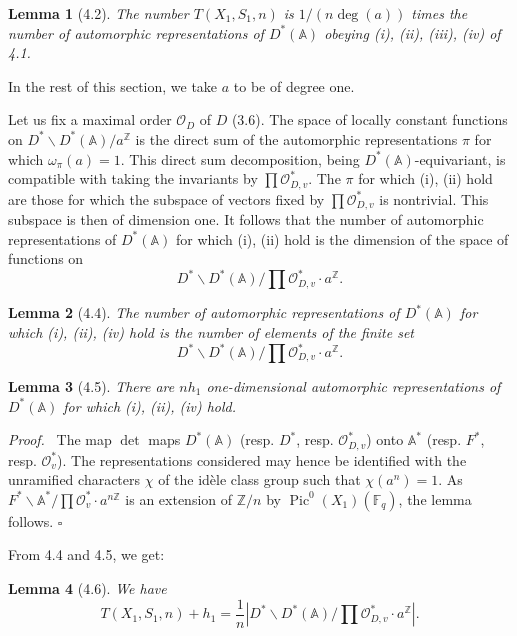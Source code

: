 \documentclass[10pt]{article}
\newcommand{\Fq}{\mathbb F_q}
\newcommand{\Z}{\mathbb Z}
\newcommand{\Adele}{\mathbb A}
\newcommand{\Pic}{\operatorname{Pic}}
\newcommand{\degm}{\operatorname{deg}}
\newcommand{\detm}{\operatorname{det}}
\newcommand{\OD}{\mathcal O_D}
\newcommand{\OO}{\mathcal O}
\theoremstyle{deligne}
\newtheorem*{lemma*}{Lemma}
\newenvironment{proofdel}[1][Proof.]{\textit{#1}\ }{\hfill$\square$}
\newcommand{\heading}[1]{\vspace{0.7em}\noindent{\bfseries #1}\quad}
\begin{document}
\begin{lemma*}[4.2]
The number $T(X_1,S_1,n)$ is $1/(n\degm(a))$ times the number of automorphic representations of $D^*(\Adele)$ obeying (i), (ii), (iii), (iv) of 4.1.
\end{lemma*}

In the rest of this section, we take $a$ to be of degree one.

\heading{4.3.} Let us fix a maximal order $\OD$ of $D$ (3.6). The space of locally constant functions on $D^*\backslash D^*(\Adele)/a^\Z$ is the direct sum of the automorphic representations $\pi$ for which $\omega_\pi(a)=1$. This direct sum decomposition, being $D^*(\Adele)$-equivariant, is compatible with taking the invariants by $\prod\mathcal O_{D,v}^*$. The $\pi$ for which (i), (ii) hold are those for which the subspace of vectors fixed by $\prod\mathcal O_{D,v}^*$ is nontrivial. This subspace is then of dimension one. It follows that the number of automorphic representations of $D^*(\Adele)$ for which (i), (ii) hold is the dimension of the space of functions on
\[
D^*\backslash D^*(\Adele)/\prod\mathcal O_{D,v}^*\cdot a^\Z .
\]

\begin{lemma*}[4.4]
The number of automorphic representations of $D^*(\Adele)$ for which (i), (ii), (iv) hold is the number of elements of the finite set
\begin{equation}\tag{4.4.1}
D^*\backslash D^*(\Adele)/\prod\mathcal O_{D,v}^*\cdot a^\Z.
\end{equation}
\end{lemma*}

\begin{lemma*}[4.5]
There are $n h_1$ one-dimensional automorphic representations of $D^*(\Adele)$ for which (i), (ii), (iv) hold.
\end{lemma*}

\begin{proofdel}
The map $\detm$ maps $D^*(\Adele)$ (resp. $D^*$, resp. $\mathcal O_{D,v}^*$) onto $\Adele^*$ (resp. $F^*$, resp. $\OO_v^*$). The representations considered may hence be identified with the unramified characters $\chi$ of the id\`ele class group such that $\chi(a^n)=1$. As $F^*\backslash\Adele^*/\prod\OO_v^*\cdot a^{n\Z}$ is an extension of $\Z/n$ by $\Pic^0(X_1)(\Fq)$, the lemma follows.
\end{proofdel}

From 4.4 and 4.5, we get:
\begin{lemma*}[4.6]
We have
\[
T(X_1,S_1,n)+h_1=\frac1n\left|D^*\backslash D^*(\Adele)/\prod\mathcal O_{D,v}^*\cdot a^\Z\right|.
\]
\end{lemma*}
\end{document}
